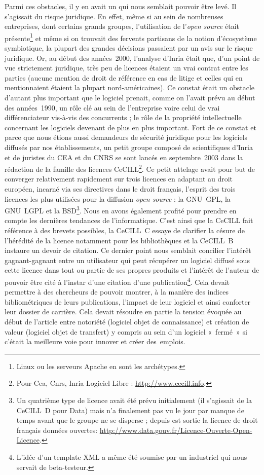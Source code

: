 \documentclass{FramateX}
\begin{document}
\begin{refsection}
\bigskip

Parmi ces obstacles, il y en avait un qui nous semblait pouvoir être
levé. Il s'agissait du risque juridique. En effet, même si au sein de
nombreuses entreprises, dont certains grands groupes, l'utilisation de
l'\textit{open source} était
présente\footnote{Linux ou les serveurs Apache
en sont les archétypes.} et même si on trouvait des fervents partisans
de la notion d'écosystème symbiotique, la plupart des grandes décisions
passaient par un avis sur le risque juridique. Or, au début des
années~2000, l'analyse d'Inria était que, d'un point de vue strictement
juridique, très peu de licences étaient un vrai contrat entre les
parties (aucune mention de droit de référence en cas de litige et
celles qui en mentionnaient étaient la plupart nord-américaines). Ce
constat était un obstacle d'autant plus important que le logiciel
prenait, comme on l'avait prévu au début des années~1990, un rôle clé
au sein de l'entreprise voire celui de vrai différenciateur vis-à-vis
des concurrents ; le rôle de la propriété intellectuelle concernant les
logiciels devenant de plus en plus important. Fort de ce constat et
parce que nous étions aussi demandeurs de sécurité juridique pour les
logiciels diffusés par nos établissements, un petit groupe composé de
scientifiques d'Inria et de juristes du CEA et du CNRS se sont lancés
en septembre~2003 dans la rédaction de la famille des licences
CeCILL\footnote{Pour Cea, Cnrs, Inria Logiciel
Libre : \url{http://www.cecill.info}.}. Ce petit attelage avait pour but de converger relativement rapidement sur trois licences en adaptant au
droit européen, incarné via ses directives dans le droit français,
l'esprit des trois licences les plus utilisées pour la diffusion
\textit{open source} : la GNU~GPL, la GNU~LGPL et la
BSD\footnote{Un quatrième type de licence
avait été prévu initialement (il s'agissait de la CeCILL~D pour Data)
mais n'a finalement pas vu le jour par manque de temps avant que le
groupe ne se disperse ; depuis est sortie la licence de droit français
données ouvertes: \url{http://www.data.gouv.fr/Licence-Ouverte-Open-Licence}.}. Nous en
avons également profité pour prendre en compte les dernières tendances
de l'informatique. C'est ainsi que la CeCILL fait référence à des
brevets possibles, la CeCILL~C essaye de clarifier la césure de
l'hérédité de la licence notamment pour les bibliothèques et la
CeCILL~B instaure un devoir de citation. Ce dernier point nous semblait
concilier l'intérêt gagnant-gagnant entre un utilisateur qui peut
récupérer un logiciel diffusé sous cette licence dans tout ou partie de
ses propres produits et l'intérêt de l'auteur de pouvoir être cité à
l'instar d'une citation d'une
publication\footnote{L'idée d'un template XML a même été soumise par un industriel qui nous servait de beta-testeur.}. Cela devait permettre à des chercheurs de pouvoir montrer, à la
manière des indices bibliométriques de leurs publications, l'impact de
leur logiciel et ainsi conforter leur dossier de carrière. Cela devait
résoudre en partie la tension évoquée au début de l'article entre
notoriété (logiciel objet de connaissance) et création de valeur
(logiciel objet de transfert) y compris au sein d'un logiciel «~fermé~»
si c'était la meilleure voie pour innover et créer des~emplois. 



\end{refsection}
\end{document}
